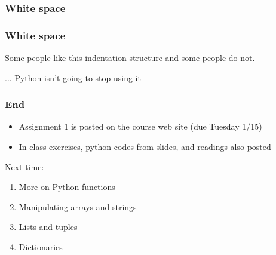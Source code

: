 \documentclass{beamer}
\begin{document}
\begin{frame}
\frametitle{White space}


\end{frame}

\begin{frame}
\frametitle{White space}

Some people like this indentation structure and some people do not.

\vspace{0.2in}

... Python isn't going to stop using it

\end{frame}


\begin{frame}
\frametitle{End}
\begin{itemize}
\setlength{\itemsep}{0.05in}
\item{Assignment 1 is posted on the course web site (due Tuesday 1/15)}
\item{In-class exercises, python codes from slides, and readings also posted}
\end{itemize}

Next time:
\begin{enumerate}
\setlength{\itemsep}{0.05in}
\item{More on Python functions}
\item{Manipulating arrays and strings}
\item{Lists and tuples}
\item{Dictionaries}
\end{enumerate}

\end{frame}
\end{document}
